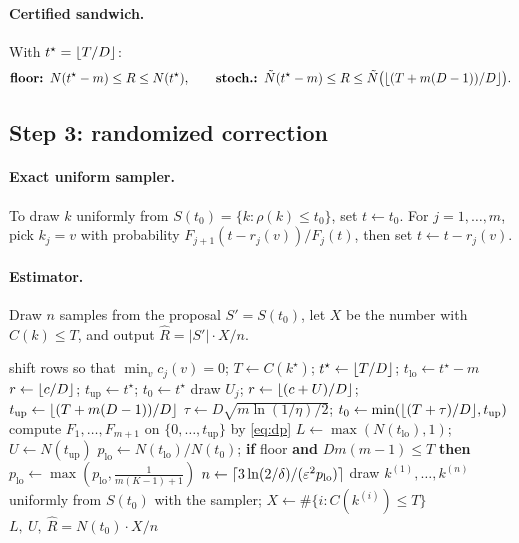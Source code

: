 \paragraph{Certified sandwich.} With $t^\star=\lfloor T/D\rfloor$:
\[
\textbf{floor: } N(t^\star-m)\le R\le N(t^\star),\qquad
\textbf{stoch.: } \tilde N(t^\star-m)\le R\le \tilde N\big(\lfloor(T+m(D-1))/D\rfloor\big).
\]

\subsection{Step 3: randomized correction}
\paragraph{Exact uniform sampler.} To draw $k$ uniformly from $S(t_0)=\{k:\rho(k)\le t_0\}$, set $t\gets t_0$.
For $j=1,\dots,m$, pick $k_j=v$ with probability $F_{j+1}(t-r_j(v))/F_j(t)$, then set $t\gets t-r_j(v)$.

\paragraph{Estimator.} Draw $n$ samples from the proposal $S'=S(t_0)$, let $X$ be the number
with $C(k)\le T$, and output $\hat R=|S'|\cdot X/n$.

\begin{algorithm}[h]
\caption{\textsc{RRDP-Rank}$(c,k^\star,D,\textit{mode},\eps,\delta,\eta)$}\label{alg:rrdp}
\begin{algorithmic}[1]
\State shift rows so that $\min_v c_j(v)=0$; \quad $T\gets C(k^\star)$; \quad $t^\star\gets\lfloor T/D\rfloor$; \quad $t_{\mathrm{lo}}\gets t^\star-m$
   \State $r\gets\lfloor c/D\rfloor$; \quad $t_{\mathrm{up}}\gets t^\star$; \quad $t_0\gets t^\star$
\Else
   \State draw $U_j$; \quad $r\gets\lfloor(c+U)/D\rfloor$; \quad $t_{\mathrm{up}}\gets\lfloor(T+m(D-1))/D\rfloor$
   \State $\tau\gets D\sqrt{m\ln(1/\eta)/2}$; \quad $t_0\gets\min(\lfloor(T+\tau)/D\rfloor,t_{\mathrm{up}})$
\EndIf
\State compute $F_1,\dots,F_{m+1}$ on $\{0,\dots,t_{\mathrm{up}}\}$ by \eqref{eq:dp}
\State $L\gets\max(N(t_{\mathrm{lo}}),1)$; \quad $U\gets N(t_{\mathrm{up}})$ 
\State $p_{\mathrm{lo}}\gets N(t_{\mathrm{lo}})/N(t_0)$; \quad
       \textbf{if} floor \textbf{and} $Dm(m-1)\le T$ \textbf{then} $p_{\mathrm{lo}}\gets\max(p_{\mathrm{lo}},\frac1{m(K-1)+1})$
\State $n\gets\lceil3\ln(2/\delta)/(\varepsilon^2p_{\mathrm{lo}})\rceil$
\State draw $k^{(1)},\dots,k^{(n)}$ uniformly from $S(t_0)$ with the sampler; \quad $X\gets\#\{i: C(k^{(i)})\le T\}$
\State \Return $L,\ U,\ \hat R=N(t_0)\cdot X/n$
\end{algorithmic}
\end{algorithm}

